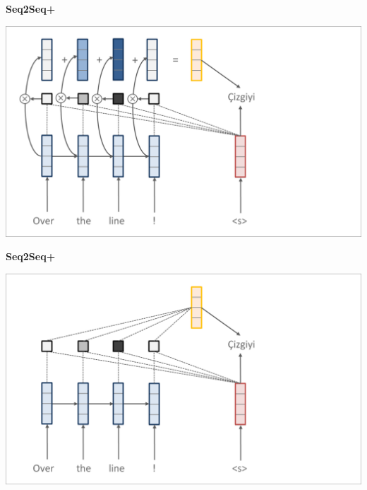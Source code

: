 \documentclass[aspectratio=169]{beamer}
\newcommand{\air}{\vspace{0.25cm}}
\begin{document}
\begin{frame}
  \begin{center}
    \textbf{Seq2Seq+} \air

  \end{center}
\center
\vspace{-5mm}
 \air
\includegraphics[scale=0.37]{nmt-attn6}
\end{frame}
\begin{frame}
  \begin{center}
    \textbf{Seq2Seq+} \air

  \end{center}
\center
\vspace{-5mm}
 \air
\includegraphics[scale=0.37]{nmt-attn7}
\end{frame}
\end{document}
